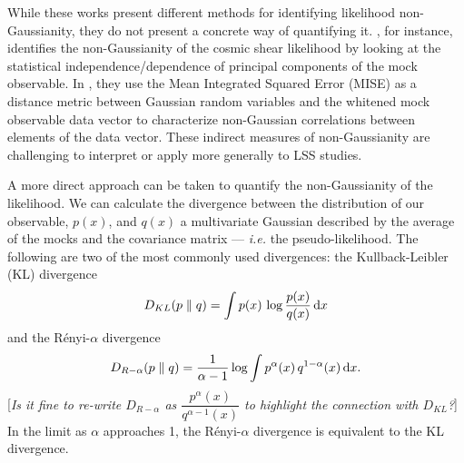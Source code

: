\documentclass[12pt, letterpaper, preprint]{aastex}
\newcommand{\beq}{\begin{equation}}
\newcommand{\eeq}{\end{equation}}
\newcommand{\ms}[1]{{\color{orange}{\bf MS:}} {[\em #1}]}
\newcommand{\lss}{{\small{LSS}}\xspace}
\begin{document}
While these works present different methods for identifying 
likelihood non-Gaussianity, they do not present a concrete way of 
quantifying it. \cite{hartlap2009}, for instance, identifies the
non-Gaussianity of the cosmic shear likelihood by looking at the
statistical independence/dependence of principal components of the mock 
observable. In \cite{sellentin2017}, they use the Mean
Integrated Squared Error (MISE) as a distance metric between 
Gaussian random variables and the whitened mock observable 
data vector to characterize non-Gaussian correlations between elements 
of the data vector. These indirect measures of non-Gaussianity 
are challenging to interpret or apply more generally to \lss studies. 

A more direct approach can be taken to quantify the 
non-Gaussianity of the likelihood. We can calculate the divergence between 
the distribution of our observable, $p(x)$, and $q(x)$ a multivariate Gaussian described 
by the average of the mocks and the covariance matrix --- \emph{i.e.} 
the pseudo-likelihood. The following are two of the most commonly used 
divergences: the Kullback-Leibler (KL) divergence
\beq \label{eq:kl} 
D_{KL} ( p \parallel q ) = \int p(x)\,\log \frac{p(x)}{q(x)}\,{\rm d}x
\eeq
and the R\'enyi-$\alpha$ divergence
\beq \label{eq:renyi}
D_{R-\alpha} ( p \parallel q ) = \frac{1}{\alpha -1} \log \int p^\alpha(x)\, q^{1 -\alpha}(x)\,{\rm d}x. 
\eeq
\ms{Is it fine to re-write $D_{R-\alpha}$ as $\dfrac{p^\alpha(x)}{q^{\alpha - 1}(x)}$ to highlight the connection with $D_{KL}$?}
In the limit as $\alpha$ approaches 1, the R\'enyi-$\alpha$ divergence is
equivalent to the KL divergence.
\end{document}
